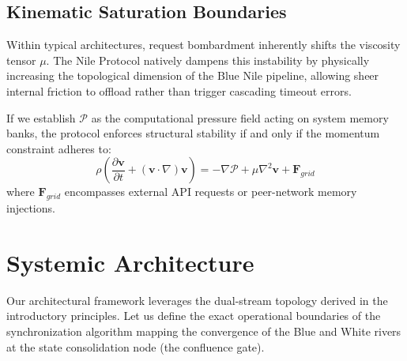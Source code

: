 \documentclass[12pt, a4paper]{article}
\theoremstyle{plain}
\theoremstyle{definition}
\begin{document}
\subsection{Kinematic Saturation Boundaries}
Within typical architectures, request bombardment inherently shifts the viscosity tensor $\mu$. The Nile Protocol natively dampens this instability by physically increasing the topological dimension of the Blue Nile pipeline, allowing sheer internal friction to offload rather than trigger cascading timeout errors. 

If we establish $\mathcal{P}$ as the computational pressure field acting on system memory banks, the protocol enforces structural stability if and only if the momentum constraint adheres to:
\begin{equation}
    \rho \left( \frac{\partial \mathbf{v}}{\partial t} + (\mathbf{v} \cdot \nabla) \mathbf{v} \right) = -\nabla \mathcal{P} + \mu \nabla^2 \mathbf{v} + \mathbf{F}_{grid}
\end{equation}
where $\mathbf{F}_{grid}$ encompasses external API requests or peer-network memory injections.

\section{Systemic Architecture}\label{sec:architecture}

Our architectural framework leverages the dual-stream topology derived in the introductory principles. Let us define the exact operational boundaries of the synchronization algorithm mapping the convergence of the Blue and White rivers at the state consolidation node (the confluence gate).
\end{document}
